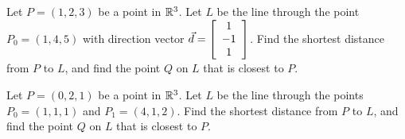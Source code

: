 \documentclass{ximera}
\begin{document}
\begin{exercise} Let $P = (1,2,3)$ be a point in $\R^3$. Let $L$ be the line
  through the point $P_0 = (1, 4, 5)$ with direction vector
  $\vect{d} = \startmat{c} 1 \\ -1 \\
    1 \stopmat$. Find the shortest distance from $P$ to
  $L$, and find the point $Q$ on $L$ that is closest to $P$.
\end{exercise}

\begin{exercise} Let $P = (0,2,1)$ be a point in $\R^3$. Let $L$ be the line through the points $P_0 = (1, 1, 1)$ and $P_1 = (4, 1, 2)$. Find the shortest distance from $P$ to $L$, and find the point $Q$ on $L$ that is closest to $P$.
\end{exercise}
\end{document}
